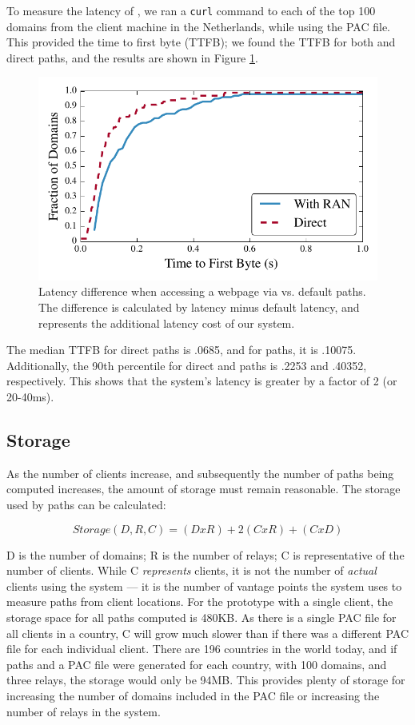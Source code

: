 To measure the latency of \system{}, we ran a {\tt curl} command to each of the 
top 100 domains from the client machine in the Netherlands, while using the PAC file. 
This provided the time to first byte (TTFB); we found the TTFB for both \system{} and 
direct paths, and the results are shown in Figure \ref{fig:latency}.  

\begin{figure}[t]
\centering
\includegraphics[width=.5\textwidth]{latency}
\caption{Latency difference when accessing a webpage via \system{} vs. default paths. 
The difference is calculated by \system{} latency minus default latency, and represents 
the additional latency cost of our system.}
\label{fig:latency}
\end{figure}

The median TTFB for direct paths is .0685, and for \system{} paths, it is .10075.  Additionally, 
the 90th percentile for direct and \system{} paths is .2253 and .40352, respectively.  This 
shows that the system's latency is greater by a factor of 2 (or 20-40ms).  

\subsection{Storage}
As the number of clients increase, and subsequently the number of paths being 
computed increases, the amount of storage must remain reasonable.  The storage 
used by paths can be calculated:

\[Storage(D,R,C) = (D x R) + 2(C x R) + (C x D) \]

D is the number of domains; R is the number of relays; C is representative of the number of 
clients.  While C {\it represents} clients, it is not the number of {\it actual} clients using the 
system --- it is the number of vantage points the system uses to measure paths 
from client locations.  For the prototype with a single client, the storage space for all 
paths computed is 480KB.  As there is a single PAC file for all clients in 
a country, C will grow much slower than if there was a different PAC file for 
each individual client.  There are 196 countries in the world today, and if 
paths and a PAC file were generated for each country, with 100 domains, and 
three relays, the storage would only be 94MB.  This provides plenty of storage 
for increasing the number of domains included in the PAC file or increasing 
the number of relays in the system.

